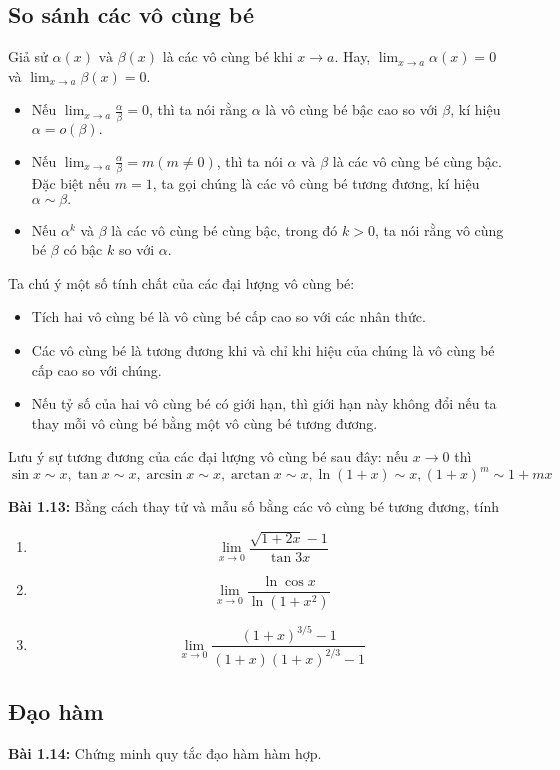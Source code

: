 \subsection*{So sánh các vô cùng bé}
 Giả sử \(\alpha(x)\text{ và }\beta(x)\) là các vô cùng bé khi $x\rightarrow a$. Hay, \(\lim_{x\rightarrow a}\alpha(x)=0\) và \(\lim_{x\rightarrow a}\beta(x)=0\).
\begin{itemize}
    \item Nếu \(\lim_{x\rightarrow a}\frac{\alpha}{\beta}=0\), thì ta nói rằng $\alpha$ là vô cùng bé bậc cao so với $\beta$, kí hiệu $\alpha=o(\beta).$ 
    \item Nếu \(\lim_{x\rightarrow a}\frac{\alpha}{\beta}=m ( m\neq 0)\), thì ta nói \(\alpha\text{ và }\beta\) là các vô cùng bé cùng bậc. Đặc biệt nếu \(m=1\), ta gọi chúng là các vô cùng bé tương đương, kí hiệu $\alpha\sim \beta.$
    \item Nếu \(\alpha^k\) và \(\beta\) là các vô cùng bé cùng bậc, trong đó \(k>0\), ta nói rằng vô cùng bé \(\beta\) có bậc \(k\) so với \(\alpha\).
\end{itemize}
Ta chú ý một số tính chất của các đại lượng vô cùng bé:
\begin{itemize}
    \item Tích hai vô cùng bé là vô cùng bé cấp cao so với các nhân thức.
    \item Các vô cùng bé là tương đương khi và chỉ khi hiệu của chúng là vô cùng bé cấp cao so với chúng.
    \item Nếu tỷ số của hai vô cùng bé có giới hạn, thì giới hạn này không đổi nếu ta thay mỗi vô cùng bé bằng một vô cùng bé tương đương.
\end{itemize}
Lưu ý sự tương đương của các đại lượng vô cùng bé sau đây: nếu \(x\rightarrow 0\) thì \[\sin x\sim x, \tan x\sim x, \arcsin x\sim x, \arctan x\sim x, \ln(1+x)\sim x, (1+x)^m\sim 1+mx\]

\textbf{Bài 1.13:} 
Bằng cách thay tử và mẫu số bằng các vô cùng bé tương đương, tính 
\begin{enumerate}[label=(\alph*)]
    \item \[\lim_{x\rightarrow 0}\frac{\sqrt{1+2x}-1}{\tan 3x}\]
    \item \[\lim_{x\rightarrow 0}\frac{\ln \cos x}{\ln (1+x^2)}\]
    \item \[\lim_{x\rightarrow 0}\frac{(1+x)^{3/5}-1}{(1+x)(1+x)^{2/3}-1}\]
\end{enumerate}

\subsection*{Đạo hàm}
\textbf{Bài 1.14:} Chứng minh quy tắc đạo hàm hàm hợp.
\vspace{5pt}

